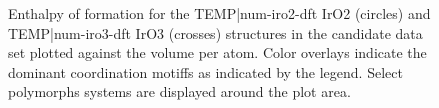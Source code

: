 \begin{figure}[!htb]
\centering
{}
\caption{\label{fig:iro2_al}
Enthalpy of formation for the TEMP|num-iro2-dft IrO2 (circles) and TEMP|num-iro3-dft IrO3 (crosses) structures in the candidate data set plotted against the volume per atom.
%
Color overlays indicate the dominant coordination motiffs as indicated by the legend.
%
Select polymorphs systems are displayed around the plot area.
}
\end{figure}








